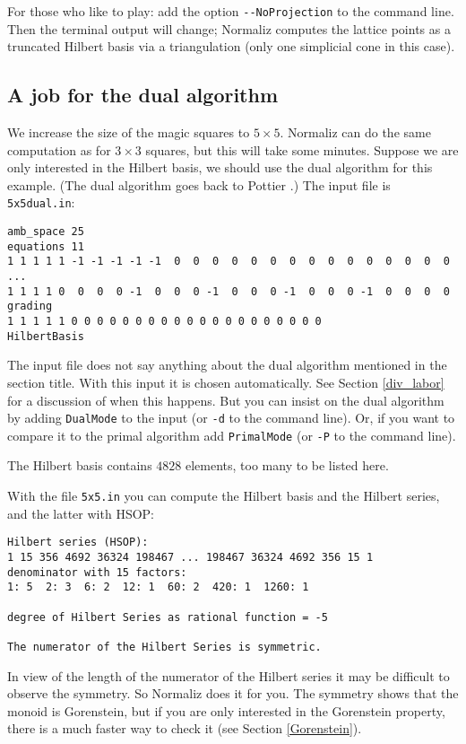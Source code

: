 \documentclass[12pt,a4paper]{scrartcl}
\theoremstyle{definition}
\def\ttt{\texttt}
\begin{document}
For those who like to play: add the option \verb|--NoProjection| to the command line. Then the terminal output will change; Normaliz computes the lattice points as a truncated Hilbert basis via a triangulation (only one simplicial cone in this case).

\subsection{A job for the dual algorithm}\label{job_dual}

We increase the size of the magic squares to $5\times 5$. Normaliz can do the same computation as for $3\times 3$ squares, but this will take some minutes. Suppose we are only interested in the Hilbert basis, we should use the dual algorithm for this example. (The dual algorithm goes back to Pottier \cite{Po}.) The input file is \ttt{5x5dual.in}:

\begin{Verbatim}
amb_space 25
equations 11
1 1 1 1 1 -1 -1 -1 -1 -1  0  0  0  0  0  0  0  0  0  0  0  0  0  0  0
...
1 1 1 1 0  0  0  0 -1  0  0  0 -1  0  0  0 -1  0  0  0 -1  0  0  0  0
grading
1 1 1 1 1 0 0 0 0 0 0 0 0 0 0 0 0 0 0 0 0 0 0 0 0
HilbertBasis
\end{Verbatim}
The input file does not say anything about the dual algorithm mentioned in the section title. With this input it is chosen automatically. See Section \ref{div_labor} for a discussion of when this happens. But you can insist on the dual algorithm by adding \verb|DualMode| to the input (or \verb|-d| to the command line). Or, if you want to compare it to the primal algorithm add \verb|PrimalMode| (or \verb|-P| to the command line).


The Hilbert basis contains $4828$ elements, too many to be listed here.

With the file \verb|5x5.in| you can compute the Hilbert basis and the Hilbert series, and the latter with HSOP:
\begin{Verbatim}
Hilbert series (HSOP):
1 15 356 4692 36324 198467 ... 198467 36324 4692 356 15 1 
denominator with 15 factors:
1: 5  2: 3  6: 2  12: 1  60: 2  420: 1  1260: 1  

degree of Hilbert Series as rational function = -5

The numerator of the Hilbert Series is symmetric.
\end{Verbatim}
In view of the length of the numerator of the Hilbert series it may be difficult to observe the symmetry. So Normaliz does it for you.  The symmetry shows that the monoid is Gorenstein, but if you are only interested in the Gorenstein property, there is a much faster way to check it (see Section \ref{Gorenstein}).
\end{document}
